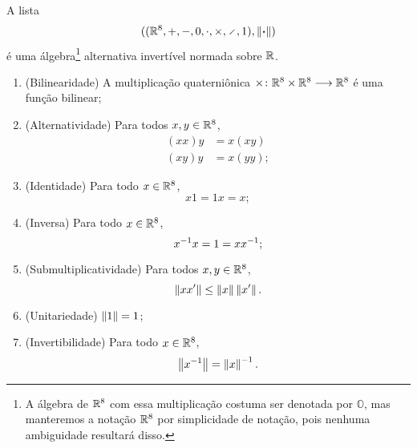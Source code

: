 \begin{comment}
Isso nos permite calcular que existem $480$ diferentes escolhas de operações $\times$ que fazem de $\R^8$ uma álgebra isomorfa aos octônios.
\end{comment}

\begin{exercise}
A lista
	\begin{equation*}
	((\R^8,+,-,0,\cdot,\times,\div,1),\nor{\var})
	\end{equation*}
é uma álgebra\footnote{A álgebra de $\mathbb{R}^8$ com essa multiplicação costuma ser denotada por $\mathbb{O}$, mas manteremos a notação $\mathbb{R}^8$ por simplicidade de notação, pois nenhuma ambiguidade resultará disso.} alternativa invertível normada sobre $\mathbb{R}$.
\begin{enumerate}
	\item (Bilinearidade) A multiplicação quaterniônica ${\times}\colon {\mathbb{R}^8 \times \mathbb{R}^8} \longrightarrow {\mathbb{R}^8}$ é uma função bilinear;
	\item (Alternatividade) Para todos $x,y \in \mathbb{R}^8$,
		\begin{align*}
		(xx)y &= x(xy) \\
		(xy)y &= x(yy);
		\end{align*}
	\item (Identidade) Para todo $x \in \mathbb{R}^8$,
		\begin{equation*}
		x1 = 1x = x;
		\end{equation*}
	\item (Inversa) Para todo $x \in \mathbb{R}^8$,
		\begin{equation*}
		x^{-1} x = 1 = xx^{-1};
		\end{equation*}
	\item (Submultiplicatividade) Para todos $x,y \in \mathbb{R}^8$,
		\begin{equation*}
		\left\Vert{xx'}\right\Vert \leq \left\Vert{x}\right\Vert\left\Vert{x'}\right\Vert.
		\end{equation*}
	\item (Unitariedade) $\left\Vert{1}\right\Vert=1$;
	\item (Invertibilidade) Para todo $x \in \mathbb{R}^8$,
		\begin{equation*}
		\left\Vert{x^{-1}}\right\Vert = \left\Vert{x}\right\Vert^{-1}.
		\end{equation*}
\end{enumerate}
\end{exercise}








